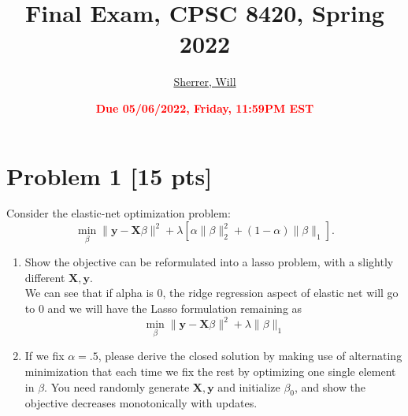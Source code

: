 \documentclass[11pt]{article}
\title{{\bf Final Exam, CPSC 8420, Spring 2022}}
\author{\Large\underline{Sherrer, Will}}%
\date{\textbf{\Large\textcolor{red}{Due 05/06/2022, Friday, 11:59PM EST}}}
\newcommand{\mtx}[1]{\mathbf{#1}}
\newcommand{\vct}[1]{\mathbf{#1}}
\def \mX {\mtx{X}}
\def \vy {\vct{y}}
\begin{document}
\maketitle

\section*{Problem 1 [15 pts]}
Consider the elastic-net optimization problem:
\begin{equation}
\min_{\beta} \|\vy-\mX\beta\|^2+\lambda[\alpha\|\beta\|^2_2+(1-\alpha)\|\beta\|_1].
\end{equation}
\begin{enumerate}
	\item Show the objective can be reformulated into a lasso problem, with a slightly different $\mX, \vy$.\\
	
	We can see that if alpha is 0, the ridge regression aspect of elastic net will go to 0 and we will have the Lasso formulation remaining as
\begin{equation}
\min_{\beta} \|\vy-\mX\beta\|^2+\lambda\|\beta\|_1
\end{equation}
	\item If we fix $\alpha=.5$, please derive the closed solution by making use of alternating minimization that each time we fix the rest by optimizing one single element in $\beta$. You need randomly generate $\mX, \vy$ and initialize  $\beta_0$, and show the objective decreases monotonically with updates.\\\\


\end{enumerate}
\end{document}
